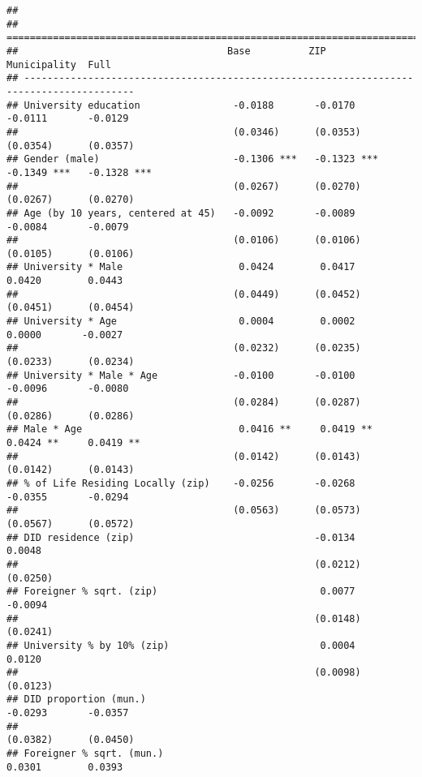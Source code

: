 \documentclass[
]{article}
\begin{document}
\begin{verbatim}
## 
## =========================================================================================
##                                    Base          ZIP           Municipality  Full        
## -----------------------------------------------------------------------------------------
## University education                -0.0188       -0.0170       -0.0111       -0.0129    
##                                     (0.0346)      (0.0353)      (0.0354)      (0.0357)   
## Gender (male)                       -0.1306 ***   -0.1323 ***   -0.1349 ***   -0.1328 ***
##                                     (0.0267)      (0.0270)      (0.0267)      (0.0270)   
## Age (by 10 years, centered at 45)   -0.0092       -0.0089       -0.0084       -0.0079    
##                                     (0.0106)      (0.0106)      (0.0105)      (0.0106)   
## University * Male                    0.0424        0.0417        0.0420        0.0443    
##                                     (0.0449)      (0.0452)      (0.0451)      (0.0454)   
## University * Age                     0.0004        0.0002        0.0000       -0.0027    
##                                     (0.0232)      (0.0235)      (0.0233)      (0.0234)   
## University * Male * Age             -0.0100       -0.0100       -0.0096       -0.0080    
##                                     (0.0284)      (0.0287)      (0.0286)      (0.0286)   
## Male * Age                           0.0416 **     0.0419 **     0.0424 **     0.0419 ** 
##                                     (0.0142)      (0.0143)      (0.0142)      (0.0143)   
## % of Life Residing Locally (zip)    -0.0256       -0.0268       -0.0355       -0.0294    
##                                     (0.0563)      (0.0573)      (0.0567)      (0.0572)   
## DID residence (zip)                               -0.0134                      0.0048    
##                                                   (0.0212)                    (0.0250)   
## Foreigner % sqrt. (zip)                            0.0077                     -0.0094    
##                                                   (0.0148)                    (0.0241)   
## University % by 10% (zip)                          0.0004                      0.0120    
##                                                   (0.0098)                    (0.0123)   
## DID proportion (mun.)                                           -0.0293       -0.0357    
##                                                                 (0.0382)      (0.0450)   
## Foreigner % sqrt. (mun.)                                         0.0301        0.0393    

\end{verbatim}
\end{document}
